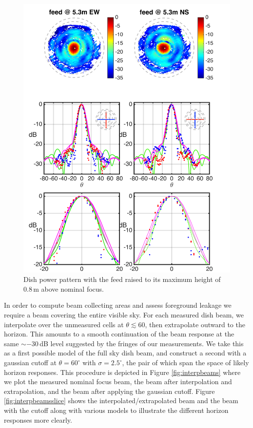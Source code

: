 \documentclass{emulateapj}
\begin{document}
\begin{figure}[h]
\includegraphics[width=6.5in]{dish4_abs_old_ref_model.png}
\caption{Dish power pattern with the feed raised to its maximum height of 0.8\,m above nominal focus.}
\label{fig:dish4}
\end{figure}

In order to compute beam collecting areas and assess foreground leakage we require a beam covering the entire visible sky. For each measured dish beam, we interpolate over the unmeasured cells at $\theta\lesssim60$, then extrapolate outward to the horizon. This amounts to a smooth continuation of the beam response at the same $\sim-30$\,dB level suggested by the fringes of our measurements. We take this as a first possible model of the full sky dish beam, and construct a second with a gaussian cutoff at $\theta=60^\circ$ with $\sigma=2.5^\circ$, the pair of which span the space of likely horizon responses. This procedure is depicted in Figure \ref{fig:interpbeams} where we plot the measured nominal focus beam, the beam after interpolation and extrapolation, and the beam after applying the gaussian cutoff. Figure \ref{fig:interpbeamsslice} shows the interpolated/extrapolated beam and the beam with the cutoff along with various models to illustrate the different horizon responses more clearly.
\end{document}
